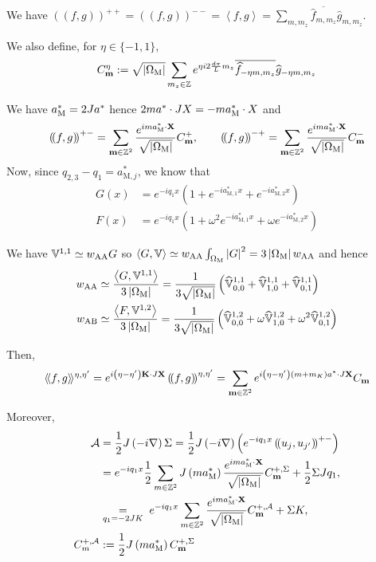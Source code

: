 \documentclass[11pt,a4paper,reqno,french,tikz]{amsart}
\newcommand\cA{\mathcal{A}}\newcommand\cB{\mathcal{B}}\newcommand\cC{\mathcal{C}}\newcommand\cD{\mathcal{D}}\newcommand\cE{\mathcal{E}}\newcommand\cF{\mathcal{F}}\newcommand\cG{\mathcal{G}}\newcommand\cH{\mathcal{H}}\newcommand\cI{\mathcal{I}}\newcommand\cJ{\mathcal{J}}\newcommand\cK{\mathcal{K}}\newcommand\cL{\mathcal{L}}\newcommand\cM{\mathcal{M}}\newcommand\cN{\mathcal{N}}\newcommand\cO{\mathcal{O}}\newcommand\cP{\mathcal{P}}\newcommand\cQ{\mathcal{Q}}\newcommand\cR{\mathcal{R}}\newcommand\cS{\mathcal{S}}\newcommand\cT{\mathcal{T}}\newcommand\cU{\mathcal{U}}\newcommand\cV{\mathcal{V}}\newcommand\cW{\mathcal{W}}\newcommand\cX{\mathcal{X}}\newcommand\cY{\mathcal{Y}}\newcommand\cZ{\mathcal{Z}}
\newcommand{\pa}[1]{\left( #1 \right)} %
\newcommand{\ab}[1]{\left|#1\right|} %
\newcommand{\ps}[1]{\left< #1 \right>} %
\newcommand{\na}{\nabla} %
\newcommand{\f}[2]{\frac{#1}{#2}} %
\newcommand{\ind}[1]{_{\textup{#1}}} %
\newcommand{\bbV}{\mathbb{V}}
\newcommand{\db}[1]{\left(\!\left( #1 \right)\!\right)}
\def\bX{{\mathbf X}}
\def\bmm{{\mathbf m}}
\def\bK{{\mathbf K}}
\def\bbV{{\mathbb V}}
\newcommand{\sqom}{\sqrt{\ab{\Omega\ind{M}}}}
\def\lAngle{\langle\!\langle}
\def\rAngle{\rangle\!\rangle}
\begin{document}
We have $\db{f,g}^{++} = \db{f,g}^{--} = \ps{f,g} = \sum_{m,m_z} \overline{\widehat{f}_{m,m_z}} \widehat{g}_{m,m_z}$.

 We also define, for $\eta \in \{-1,1\}$,
\begin{align*}
C^\eta_\bmm := \sqom\sum_{m_z \in \Z} e^{\eta i2 \f{d\pi}{L} m_z} \overline{\widehat{f}_{-\eta m,m_z}} \widehat{g}_{-\eta m,m_z}
\end{align*}


We have $a^*\ind{M} = 2 J a^*$ hence $2 ma^* \cdot JX = -m a\ind{M}^* \cdot X$ and
\begin{align*}
\db{f,g}^{+-} = \sum_{\bmm \in \Z^2} \f{e^{ima^*\ind{M} \cdot \bX}}{\sqom} C_{\bmm}^+, \qquad \db{f,g}^{-+} = \sum_{\bmm \in \Z^2} \f{e^{ima^*\ind{M} \cdot \bX}}{\sqom} C_{\bmm}^-
\end{align*}
Now, since $q_{2,3} - q_1 = a^*_{\text{M},j}$, we know that
\begin{align*}
G(x) &= e^{-iq_1 x} \pa{1 + e^{-i a_{\text{M} ,1}^* x} +e^{-i a_{\text{M},2}^* x}} \\
F(x) &= e^{-iq_1 x} \pa{1 + \omega^2 e^{-i a_{\text{M} ,1}^* x} + \omega e^{-i a_{\text{M},2}^* x}}
\end{align*}

We have $\bbV^{1,1} \simeq w\ind{AA} G$ so $\ps{G,\bbV} \simeq w\ind{AA} \int_{\Omega\ind{M}} \ab{G}^2 = 3 \ab{\Omega\ind{M}} w\ind{AA}$ and hence 
\begin{align*}
	w\ind{AA} &\simeq \f{\ps{G,\bbV^{1,1}}}{3 \ab{\Omega\ind{M}}} = \f{1}{3 \sqom}\pa{\widehat{\bbV}^{1,1}_{0,0} +\widehat{\bbV}^{1,1}_{1,0} + \widehat{\bbV}^{1,1}_{0,1}} \\
	w\ind{AB} &\simeq \f{\ps{F,\bbV^{1,2}}}{3 \ab{\Omega\ind{M}}} = \f{1}{3 \sqom}\pa{\widehat{\bbV}^{1,2}_{0,0} + \omega\widehat{\bbV}^{1,2}_{1,0} + \omega^2 \widehat{\bbV}^{1,2}_{0,1}}
\end{align*}

Then,
\begin{align*}
\lAngle f,g \rAngle ^{\eta,\eta'} = e^{i\pa{\eta-\eta'} \bK \cdot J \bX}\db{f,g}^{\eta,\eta'} =  \sum_{\bmm \in \Z^2} e^{i\pa{\eta-\eta'} \pa{m+m_K}a^* \cdot J \bX} C_\bmm
\end{align*}

Moreover, 
\begin{align*}
	\cA &= \f{1}{2} J \pa{-i\na} \Sigma= \f{1}{2} J \pa{-i\na} \pa{e^{-iq_1 x} \db{u_j,u_{j'}}^{+-}} \\
	    &= e^{-iq_1 x}\f 12 \sum_{m \in \Z^2} J \pa{ma_{\text{M}}^*} \f{e^{ima^*\ind{M} \cdot \bX}}{\sqom} C_{\bmm}^{+,\Sigma} + \f 12 \Sigma J q_1 ,\\
	    & \underset{\substack{q_1 = -2 JK}}{=} \; e^{-iq_1 x} \sum_{m \in \Z^2} \f{e^{ima^*\ind{M} \cdot \bX}}{\sqom} C_{\bmm}^{+,\cA} + \Sigma K,\\
C_{m}^{+,\cA} &:= \f 12 J \pa{ma_{\text{M}}^*}C_{\bmm}^{+,\Sigma}
\end{align*}
\end{document}
